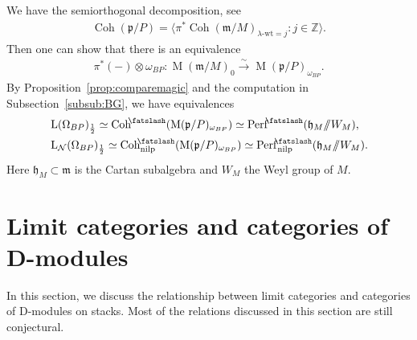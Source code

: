 \documentclass [11pt,oneside,a4paper,mathscr]{amsart}
\theoremstyle{definition}
\newcommand{\LL}{\operatorname{L}}
\newcommand{\MM}{\operatorname{M}}
\newcommand{\fp}{\mathfrak{p}}
\newcommand{\fm}{\mathfrak{m}}
\newcommand{\Coh}{\operatorname{Coh}}
\newcommand{\shear}{{\mathbin{\mkern-6mu\fatslash}}}
\newcommand{\ssslash}{/\!\!/}
\newcommand{\wt}{\mathrm{wt}}
\begin{document}
We have the semiorthogonal decomposition, see~\cite[Amplification~3.18]{halp}
\begin{align*}%
    \Coh(\mathfrak{p}/P)=\langle \pi^{*}\Coh(\fm/M)_{\lambda\text{-}\wt=j} : j\in \mathbb{Z}\rangle. 
\end{align*}
Then one can show that there is an equivalence
\begin{align*}
\pi^*(-)\otimes \omega_{BP} \colon \MM(\fm/M)_0 \stackrel{\sim}{\to}
    \MM(\fp/P)_{\omega_{BP}}. 
\end{align*}
By Proposition~\ref{prop:comparemagic} and the computation in Subsection~\ref{subsub:BG}, we have equivalences 
\begin{align*}
    &\LL(\Omega_{BP})_{\frac{1}{2}} \simeq \Coh^{\shear}(\MM(\fp/P)_{\omega_{BP}}) \simeq 
    \mathrm{Perf}^{\shear}(\mathfrak{h}_M\ssslash W_M), \\
    &\LL_{\mathcal{N}}(\Omega_{BP})_{\frac{1}{2}} \simeq \Coh^{\shear}_{\mathrm{nilp}}(\MM(\fp/P)_{\omega_{BP}}) \simeq 
    \mathrm{Perf}^{\shear}_{\mathrm{nilp}}(\mathfrak{h}_M\ssslash W_M).
\end{align*}
Here $\mathfrak{h}_M \subset \fm$ is the Cartan subalgebra and $W_M$ the Weyl group of $M$.

\section{Limit categories and categories of D-modules}\label{sec:Dmod}
In this section, we discuss the relationship between limit categories 
and categories of D-modules on stacks. Most of the relations discussed in this section 
are still conjectural.
\end{document}
